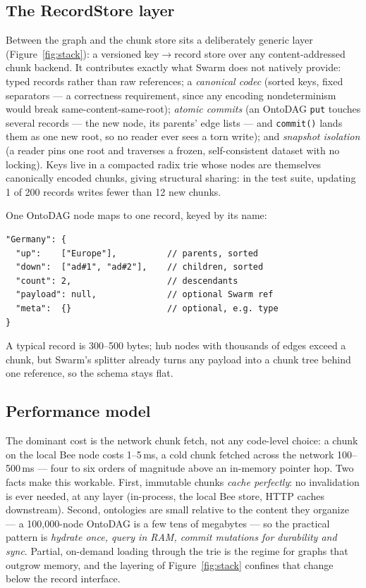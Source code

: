 \documentclass[10pt,twocolumn]{article}
\begin{document}
\subsection{The RecordStore layer}
Between the graph and the chunk store sits a deliberately generic layer
(Figure~\ref{fig:stack}): a versioned key$\to$record store over any
content-addressed chunk backend. It contributes exactly what Swarm does
not natively provide: typed records rather than raw references; a
\emph{canonical codec} (sorted keys, fixed separators --- a correctness
requirement, since any encoding nondeterminism would break
same-content-same-root); \emph{atomic commits} (an OntoDAG \texttt{put}
touches several records --- the new node, its parents' edge lists ---
and \texttt{commit()} lands them as one new root, so no reader ever sees a
torn write); and \emph{snapshot isolation} (a reader pins one root and
traverses a frozen, self-consistent dataset with no locking). Keys live in
a compacted radix trie whose nodes are themselves canonically encoded
chunks, giving structural sharing: in the test suite, updating 1 of 200
records writes fewer than 12 new chunks.

One OntoDAG node maps to one record, keyed by its name:

\begin{lstlisting}
"Germany": {
  "up":    ["Europe"],          // parents, sorted
  "down":  ["ad#1", "ad#2"],    // children, sorted
  "count": 2,                   // descendants
  "payload": null,              // optional Swarm ref
  "meta":  {}                   // optional, e.g. type
}
\end{lstlisting}

A typical record is 300--500 bytes; hub nodes with thousands of edges
exceed a chunk, but Swarm's splitter already turns any payload into a
chunk tree behind one reference, so the schema stays flat.

\subsection{Performance model}
The dominant cost is the network chunk fetch, not any code-level choice: a
chunk on the local Bee node costs 1--5\,ms, a cold chunk fetched across
the network 100--500\,ms --- four to six orders of magnitude above an
in-memory pointer hop. Two facts make this workable. First, immutable
chunks \emph{cache perfectly}: no invalidation is ever needed, at any
layer (in-process, the local Bee store, HTTP caches downstream). Second,
ontologies are small relative to the content they organize --- a
100{,}000-node OntoDAG is a few tens of megabytes --- so the practical
pattern is \emph{hydrate once, query in RAM, commit mutations for
durability and sync}. Partial, on-demand loading through the trie is the
regime for graphs that outgrow memory, and the layering of
Figure~\ref{fig:stack} confines that change below the record interface.
\end{document}
